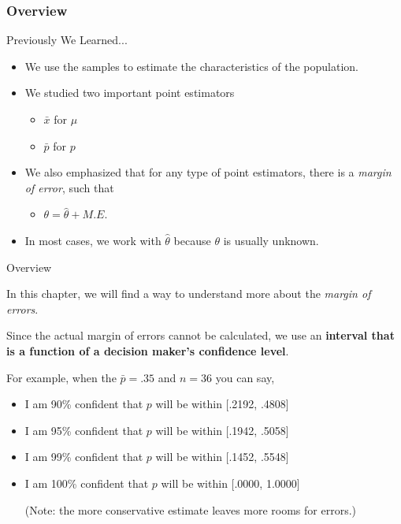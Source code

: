 \documentclass{beamer}
\begin{document}
\subsubsection{Overview}
\begin{frame}{Previously We Learned...}

\begin{itemize}
\item We use the samples to estimate the characteristics of the population.
\item We studied two important point estimators
\begin{itemize}
\item $\bar{x}$ for $\mu$
\item $\bar{p}$ for $p$
\end{itemize}
\item We also emphasized that for any type of point estimators, there is a \textit{margin of error}, such that
\begin{itemize}
\item $\theta = \hat{\theta} + M.E.$
\end{itemize}

\item In most cases, we work with $\hat{\theta}$ because $\theta$ is usually unknown. 


\end{itemize}

\end{frame}


\begin{frame}{Overview}

In this chapter, we will find a way to understand more about the \textit{margin of errors}.

\vspace{0.3 cm}
Since the actual margin of errors cannot be calculated, we use an \textbf{interval that is a function of a decision maker's confidence level}.

\vspace{0.3 cm}
For example, when the $\bar{p} = .35$ and $n = 36$ you can say,
\begin{itemize}

\item I am 90\% confident that $p$ will be within [.2192, .4808]
\item I am 95\% confident that $p$ will be within [.1942, .5058]
\item I am 99\% confident that $p$ will be within [.1452, .5548]
\item I am 100\% confident that $p$ will be within [.0000, 1.0000]

(Note: the more conservative estimate leaves more rooms for errors.)

\end{itemize}

\end{frame}
\end{document}
